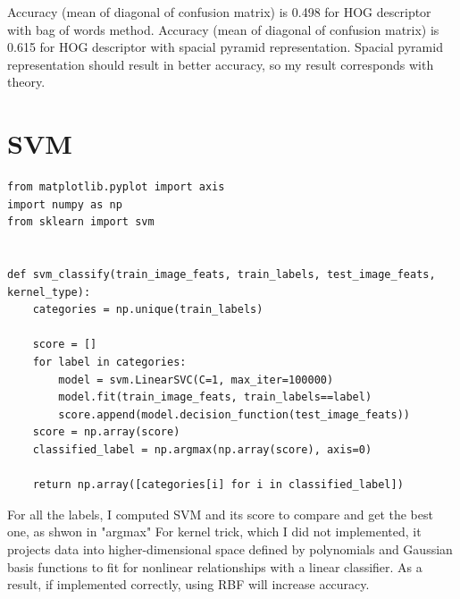 Accuracy (mean of diagonal of confusion matrix) is 0.498 for HOG descriptor with bag of words method. 
Accuracy (mean of diagonal of confusion matrix) is 0.615 for HOG descriptor with spacial pyramid representation. 
Spacial pyramid representation should result in better accuracy, so my result corresponds with theory. 

\section*{SVM}
\begin{lstlisting}
from matplotlib.pyplot import axis
import numpy as np
from sklearn import svm


def svm_classify(train_image_feats, train_labels, test_image_feats, kernel_type):
    categories = np.unique(train_labels)

    score = []
    for label in categories:
        model = svm.LinearSVC(C=1, max_iter=100000)
        model.fit(train_image_feats, train_labels==label)
        score.append(model.decision_function(test_image_feats))
    score = np.array(score)
    classified_label = np.argmax(np.array(score), axis=0)

    return np.array([categories[i] for i in classified_label])
\end{lstlisting}

For all the labels, I computed SVM and its score to compare and get the best one, as shwon in "argmax"
For kernel trick, which I did not implemented, it projects data into higher-dimensional space defined by polynomials and Gaussian basis functions to fit for nonlinear relationships with a linear classifier. As a result, if implemented correctly, using RBF will increase accuracy. 


 